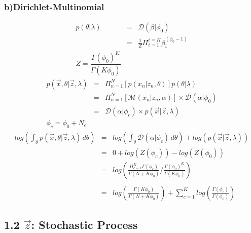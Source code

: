 \documentclass{article}
\begin{document}
\begin{spacing}{1.1}
\subsubsection*{b)Dirichlet-Multinomial}
\begin{eqnarray*} 
p(\theta|\lambda)
&=& \mathcal{D}(\beta|\phi_{0}) \\
&=& \frac{1}{Z}\Pi_{i=1}^{i=K}\beta_{i}^{(\phi_{0}-1)}\\
Z=\dfrac{\Gamma(\phi_{0})^{K}}{\Gamma(K\phi_{0})}
\end{eqnarray*}
\begin{eqnarray*} 
p(\vec x,\theta|\vec z, \lambda)
&=&\Pi_{n=1}^{N}[p(x_{n}|z_{n},\theta)]p(\theta|\lambda) \\
&=&\Pi_{n=1}^{N}[\mathcal{M}(x_{n}|z_{n},\alpha)] \times \mathcal{D}(\alpha|\phi_{0}) \\
&=&\mathcal{D}(\alpha|\phi_{c})\times p(\vec x|\vec z, \lambda) \\
\phi_{c}=\phi_{0}+N_{c}
\end{eqnarray*}
\begin{eqnarray*} 
log(\int_\theta \! p(\vec x,\theta|\vec z,\lambda) \, d\theta)
&=& log(\int_\theta \! \mathcal{D}(\alpha|\phi_{c})\, d\theta)+log(p(\vec x|\vec z, \lambda)) \\
&=& 0+log(Z(\phi_{c}))-log(Z(\phi_{0}))\\
&=& log(\frac{\Pi_{c=1}^{K}\Gamma(\phi_{c})}{\Gamma(N+K\phi_{0})}/\frac{\Gamma(\phi_{0})^{K}}{\Gamma(K\phi_{0})})\\ \\
&=& log(\frac{\Gamma(K\phi_{0})}{\Gamma(N+K\phi_{0})})+\sum_{c=1}^{K}log(\frac{\Gamma(\phi_{c})}{\Gamma(\phi_{0})})
\end{eqnarray*}

\subsection{1.2  $\vec z$: Stochastic Process}

\end{spacing}
\end{document}
